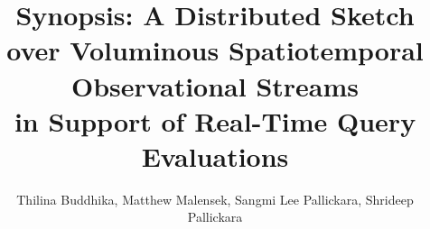 \documentclass{sig-alternate-05-2015}
\begin{document}






\title{Synopsis: A Distributed Sketch over Voluminous Spatiotemporal Observational Streams \\ in Support of Real-Time Query Evaluations}

\author{
\alignauthor
Thilina Buddhika, Matthew Malensek, Sangmi Lee Pallickara, Shrideep Pallickara \\
       \\
       \\
       \\
}

\maketitle













\end{document}

